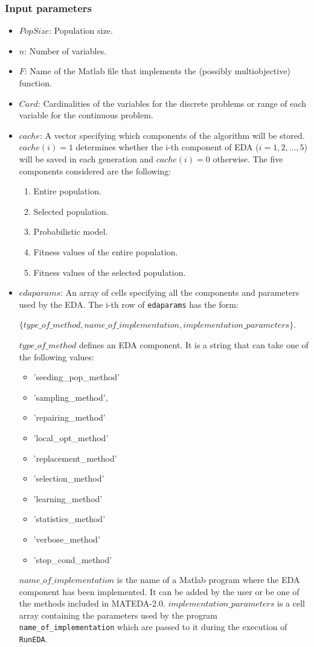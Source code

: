 \documentclass[a4paper]{article}
\begin{document}
 \subsubsection{Input parameters}

 \begin{itemize}
   \item $PopSize$: Population size.
   \item $n$: Number of variables.
   \item $F$: Name of the Matlab file that implements the (possibly
   multiobjective) function.
   \item $Card$: Cardinalities of the variables for the discrete
   problems or range of each variable for the continuous problem.
   \item $cache$: A vector specifying which components of the
   algorithm will be stored. $cache(i) = 1$ determines whether the i-th component of
   EDA ($i=1,2,\dots,5$)  will be saved in each generation and $cache(i) = 0$ otherwise. The five components considered are the following:
\begin{enumerate}
  \item Entire population.
  \item Selected population.
  \item Probabilistic model.
  \item Fitness values of the entire population.
  \item Fitness values of the selected population.
\end{enumerate}
   \item $edaparams$: An array of cells specifying all the components
   and parameters used by the EDA. The i-th row of \texttt{edaparams} has the form:




$\{type\_of\_method, name\_of\_implementation, implementation\_parameters\}$.

$type\_of\_method$ defines an EDA component. It is a string
that can take one of  the following values:

\begin{itemize}
\item 'seeding\_pop\_method'
\item 'sampling\_method',
\item 'repairing\_method'
\item 'local\_opt\_method'
\item 'replacement\_method'
\item 'selection\_method'
\item 'learning\_method'
\item 'statistics\_method'
\item 'verbose\_method'
\item 'stop\_cond\_method'
\end{itemize}

$name\_of\_implementation$ is the name of a Matlab program where the
EDA component has been implemented. It can be added by the user or
be one of the methods included in MATEDA-2.0.
$implementation\_parameters$ is a cell array containing the
parameters used by the program \texttt{name\_of\_implementation}
which are passed to it during the execution of \texttt{RunEDA}.
\end{itemize}
\end{document}
